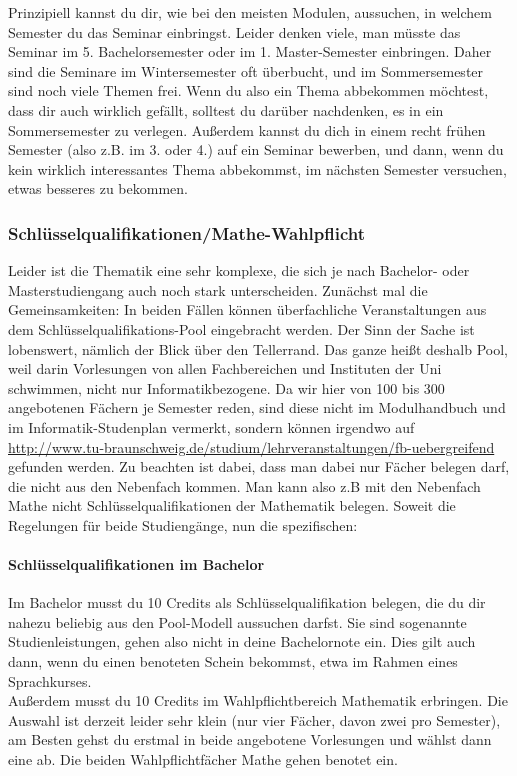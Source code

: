 Prinzipiell kannst du dir, wie bei den meisten Modulen, aussuchen, in welchem Semester du das Seminar einbringst. Leider denken viele, man müsste das Seminar im 5. Bachelorsemester oder im 1. Master-Semester einbringen. Daher sind die Seminare im Wintersemester oft überbucht, und im Sommersemester sind noch viele Themen frei. Wenn du also ein Thema abbekommen möchtest, dass dir auch wirklich gefällt, solltest du darüber nachdenken, es in ein Sommersemester zu verlegen. Außerdem kannst du dich in einem recht frühen Semester (also z.B. im 3. oder 4.) auf ein Seminar bewerben, und dann, wenn du kein wirklich interessantes Thema abbekommst, im nächsten Semester versuchen, etwas besseres zu bekommen.

\subsubsection{Schlüsselqualifikationen/Mathe-Wahl\-pflicht}
Leider ist die Thematik eine sehr komplexe, die sich je nach Bachelor-
oder Masterstudiengang auch noch stark unterscheiden. Zunächst mal
die Gemeinsamkeiten: In beiden Fällen können überfachliche
Veranstaltungen aus dem Schlüsselqualifikations-Pool eingebracht
werden. Der Sinn der Sache ist lobenswert, nämlich der Blick über den
Tellerrand.  Das ganze heißt deshalb Pool, weil darin
Vorlesungen von allen Fachbereichen und Instituten der Uni schwimmen,
nicht nur Informatikbezogene. Da wir hier von 100 bis 300 angebotenen
Fächern je Semester reden, sind diese nicht im Modulhandbuch und im
Informatik-Studenplan vermerkt, sondern können irgendwo auf
\url{http://www.tu-braunschweig.de/studium/lehrveranstaltungen/fb-uebergreifend}
gefunden werden.   Zu beachten ist dabei, dass man dabei
nur Fächer belegen darf, die nicht aus den Nebenfach kommen. Man kann
also z.B mit den Nebenfach Mathe nicht Schlüsselqualifikationen der
Mathematik belegen. 
Soweit die Regelungen für beide Studiengänge, nun die spezifischen:

\paragraph*{Schlüsselqualifikationen im Bachelor}
Im Bachelor musst du 10 Credits als Schlüsselqualifikation belegen,
die du dir nahezu beliebig aus den Pool-Modell aussuchen darfst. Sie
sind sogenannte Studienleistungen, gehen also nicht in deine
Bachelornote ein. Dies gilt auch dann, wenn du einen benoteten Schein
bekommst, etwa im Rahmen eines Sprachkurses.\\
Außerdem musst du 10 Credits im Wahlpflichtbereich Mathematik
erbringen. Die Auswahl ist derzeit leider sehr klein (nur vier
Fächer, davon zwei pro Semester), am Besten gehst du erstmal in beide
angebotene Vorlesungen und wählst dann eine ab. Die beiden
Wahlpflichtfächer Mathe gehen benotet ein.

